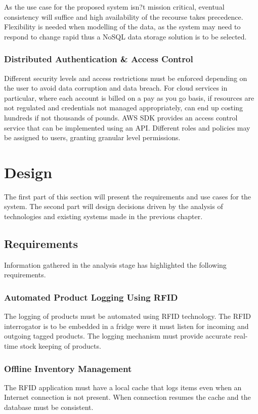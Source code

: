 \documentclass[a4paper, 11pt]{article}
\begin{document}
As the use case for the proposed system isn?t mission critical, eventual consistency will suffice and  high availability of the recourse takes precedence. Flexibility is needed when modelling of the data, as the system may need to respond to change rapid thus a NoSQL data storage solution is to be selected. 

\subsubsection{Distributed Authentication \& Access Control}
Different security levels and access restrictions must be enforced depending on the user to avoid data corruption and data breach. For cloud services in particular, where each account is billed on a pay as you go basis, if resources are not regulated and credentials not managed appropriately, can end up costing hundreds if not thousands of pounds. AWS SDK provides an access control service that can be implemented using an API. Different roles and policies may be assigned to users, granting granular level permissions. 

\clearpage

\section{Design}
The first part of this section will present the requirements and use cases for the system. The second part will design decisions driven by the analysis of technologies and existing systems made in the previous chapter. 

\subsection{Requirements}
Information gathered in the analysis stage has highlighted the following requirements. 
\subsubsection{Automated Product Logging Using RFID}
The logging of products must be automated using RFID technology. The RFID interrogator is to be embedded in a fridge were it must listen for incoming and outgoing tagged products. The logging mechanism must provide accurate real-time stock keeping of products. 
\subsubsection{Offline Inventory Management}
The RFID application must have a local cache that logs items even when an Internet connection is not present. When connection resumes the cache and the database must be consistent. 
\end{document}
